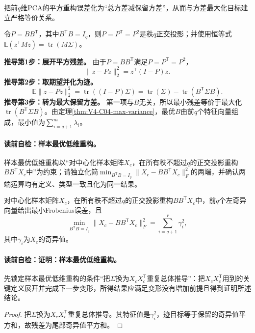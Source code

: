 \begin{derivationgoalbox}
把前$q$维PCA的平方重构误差化为“总方差减保留方差”，从而与方差最大化目标建立严格等价关系。
\end{derivationgoalbox}
\begin{derivationprepbox}
令$P=BB^{\mathsf T}$，其中$B^{\mathsf T}B=I_q$，则$P=P^{\mathsf T}=P^2$是秩$q$正交投影；并使用恒等式$\mathbb E(z^{\mathsf T}Mz)=\operatorname{tr}(M\Sigma)$。
\end{derivationprepbox}
\textbf{推导第1步：展开平方残差。}
由于$P=BB^{\mathsf T}$满足$P=P^{\mathsf T}=P^2$，
\[
\|z-Pz\|_2^2=z^{\mathsf T}(I-P)z.
\]
\textbf{推导第2步：取期望并化为迹。}
\[
\mathbb E\|z-Pz\|_2^2
=\operatorname{tr}((I-P)\Sigma)
=\operatorname{tr}(\Sigma)-\operatorname{tr}(B^{\mathsf T}\Sigma B).
\]
\textbf{推导第3步：转为最大保留方差。}
第一项与$B$无关，所以最小残差等价于最大化$\operatorname{tr}(B^{\mathsf T}\Sigma B)$。由定理\ref{thm:V4-C04-max-variance}，最优$B$由前$q$个特征向量组成，最小值为$\sum_{i=q+1}^m\lambda_i$。

\paragraph{读前自检：样本最优低维重构。}样本最优低维重构以“对中心化样本矩阵$X_c$，在所有秩不超过$q$的正交投影重构$BB^{\mathsf T}X_c$中”为约束；请独立化简$\min_{B^{\mathsf T}B=I_q}\|X_c-BB^{\mathsf T}X_c\|_F^2$的两端，并确认两端运算均有定义、类型一致且化为同一结果。\par

\begin{corollary}[样本最优低维重构]\label{cor:V4-C04-sample-reconstruction}
对中心化样本矩阵$X_c$，在所有秩不超过$q$的正交投影重构$BB^{\mathsf T}X_c$中，前$q$个左奇异向量给出最小Frobenius误差，且
\[
\min_{B^{\mathsf T}B=I_q}\|X_c-BB^{\mathsf T}X_c\|_F^2
=\sum_{i=q+1}^r\gamma_i^2,
\]
其中$\gamma_i$为$X_c$的奇异值。
\end{corollary}
\paragraph{读前自检：证明：样本最优低维重构。}先锁定样本最优低维重构的条件“把$\Sigma$换为$X_cX_c^{\mathsf T}$重复总体推导”：把$X_cX_c^{\mathsf T}$用到的关键定义展开并完成下一步变形，所得结果应满足变形没有增加前提且得到证明所述结论。\par

\begin{proof}
把$\Sigma$换为$X_cX_c^{\mathsf T}$重复总体推导。其特征值是$\gamma_i^2$，迹目标等于保留的奇异值平方和，故残差为尾部奇异值平方和。
\end{proof}

